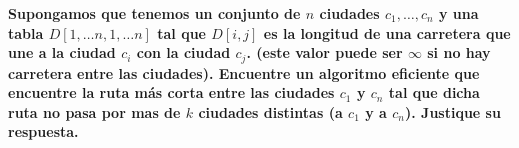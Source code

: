 \textbf{
    Supongamos que tenemos un conjunto de $n$ ciudades $c_1, \dots, c_n$
    y una tabla $D[1,\dots n, 1, \dots n]$ tal que $D[i,j]$ es la longitud
    de una carretera que une a la ciudad $c_i$ con la ciudad $c_j$. (este
    valor puede ser $\infty$ si no hay carretera entre las ciudades). 
    Encuentre un algoritmo eficiente que encuentre la ruta más corta entre 
    las ciudades $c_1$ y $c_n$ tal que dicha ruta no pasa por mas de $k$ ciudades
    distintas (a $c_1$ y a $c_n$). Justique su respuesta.
}
\vspace{.2cm}
\textcolor{bibi}{}
\begin{quote}
\end{quote}